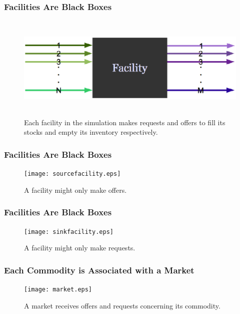\begin{frame}[ctb!]
  \frametitle{Facilities Are Black Boxes}
  \begin{figure}[htbp!]
    \begin{center}
      \includegraphics[height=5cm]{facility.eps}
    \end{center}
    \caption{ Each facility in the simulation makes requests and offers 
    to fill its stocks and empty its inventory respectively.  }
    \label{fig:facility}
  \end{figure}
\end{frame}
\begin{frame}[ctb!]
  \frametitle{Facilities Are Black Boxes}
  \begin{figure}[htbp!]
    \begin{center}
      \texttt{[image: sourcefacility.eps]}
    \end{center}
    \caption{ A facility might only make offers.} 
    \label{fig:sourcefacility}
  \end{figure}
\end{frame}
\begin{frame}[ctb!]
  \frametitle{Facilities Are Black Boxes}
  \begin{figure}[htbp!]
    \begin{center}
      \texttt{[image: sinkfacility.eps]}
    \end{center}
    \caption{ A facility might only make requests.} 
    \label{fig:sinkfacility}
  \end{figure}
\end{frame}
\begin{frame}[ctb!]
  \frametitle{Each Commodity is Associated with a Market}
  \begin{figure}[htbp!]
    \begin{center}
      \texttt{[image: market.eps]}
    \end{center}
    \caption{ A market receives offers and requests concerning its 
    commodity. } 
    \label{fig:market}
  \end{figure}
\end{frame}

